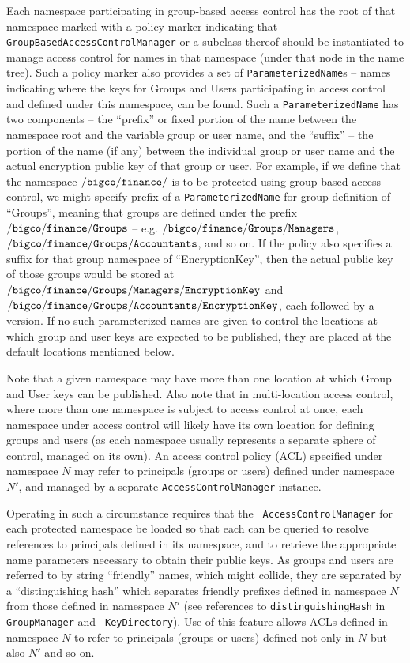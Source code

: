 Each namespace participating in group-based access control has the
root of that namespace marked with a policy marker indicating that
{\tt GroupBasedAccessControlManager} or a subclass thereof should be
instantiated to manage access control for names in that namespace
(under that node in the name tree). Such a policy marker also provides
a set of {\tt ParameterizedName}s -- names indicating where the keys
for Groups and Users participating in access control and defined under
this namespace, can be found. Such a {\tt ParameterizedName} has two
components -- the ``prefix'' or fixed portion of the name between the
namespace root and the variable group or user name, and the ``suffix''
-- the portion of the name (if any) between the individual group or
user name and the actual encryption public key of that group or
user. For example, if we define that the namespace
$\ccnxpath{/bigco/finance/}$ is to be protected using group-based
access control, we might specify prefix of a {\tt ParameterizedName}
for group definition of ``Groups'', meaning that groups are defined
under the prefix $\ccnxpath{/bigco/finance/Groups}$ --
e.g. $\ccnxpath{/bigco/finance/Groups/Managers}$,
$\ccnxpath{/bigco/finance/Groups/Accountants}$, and so on. If the
policy also specifies a suffix for that group namespace of
``EncryptionKey'', then the actual public key of those groups would be
stored at $\ccnxpath{/bigco/finance/Groups/Managers/EncryptionKey}$
and $\ccnxpath{/bigco/finance/Groups/Accountants/EncryptionKey}$, each
followed by a version. If no such parameterized names are given to control
the locations at which group and user keys are expected to be published,
they are placed at the default locations mentioned below.

Note that a given namespace may have more than one location at which
Group and User keys can be published. Also note that in multi-location
access control, where more than one namespace is subject to access
control at once, each namespace under access control will likely have
its own location for defining groups and users (as each namespace
usually represents a separate sphere of control, managed on its own).
An access control policy (ACL) specified under namespace $N$ may refer
to principals (groups or users) defined under namespace $N'$, and
managed by a separate {\tt AccessControlManager} instance. 

Operating in such a circumstance requires that the {\tt
  AccessControlManager} for each protected namespace be loaded so that
each can be queried to resolve references to principals defined in its
namespace, and to retrieve the appropriate name parameters necessary
to obtain their public keys.  As groups and users are referred to by
string ``friendly'' names, which might collide, they are separated by
a ``distinguishing hash'' which separates friendly prefixes defined in
namespace $N$ from those defined in namespace $N'$ (see references to
{\tt distinguishingHash} in {\tt GroupManager} and {\tt
  KeyDirectory}). Use of this feature allows ACLs defined in namespace
$N$ to refer to principals (groups or users) defined not only in $N$ but also
$N'$ and so on.

